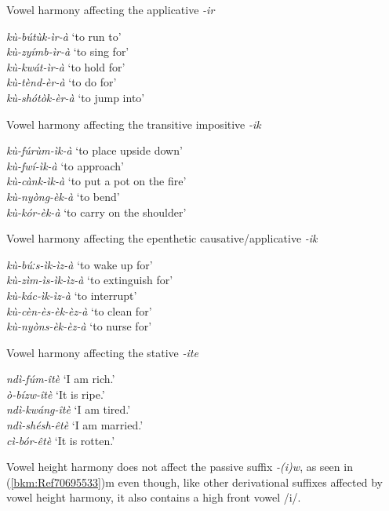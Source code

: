 \ea
\label{bkm:Ref98928900}
  Vowel harmony affecting the applicative \textit{-ir}

{\itshape kù-bútùk-ìr-à} \tab  ‘to run to’\\
{\itshape kù-zyímb-ìr-à} \tab  ‘to sing for’\\
{\itshape kù-kwát-ìr-à} \tab  ‘to hold for’\\
{\itshape kù-tènd-èr-à} \tab  ‘to do for’\\
{\itshape kù-shótòk-èr-à} \tab  ‘to jump into’\\
\z

\ea
\label{bkm:Ref98928913}
  Vowel harmony affecting the transitive impositive \textit{-ik}

{\itshape kù-fúrùm-ìk-à} \tab  ‘to place upside down’\\
{\itshape kù-fwí-ìk-à} \tab  ‘to approach’\\
{\itshape kù-cànk-ìk-à} \tab  ‘to put a pot on the fire’\\
{\itshape kù-nyòng-èk-à} \tab  ‘to bend’\\
{\itshape kù-kór-èk-à} \tab  ‘to carry on the shoulder’\\
\z

\ea
\label{bkm:Ref98928937}
  Vowel harmony affecting the epenthetic causative/applicative \textit{-ik}

{\itshape kù-búːs-ìk-ìz-à} \tab  ‘to wake up for’\\
{\itshape kù-zìm-ìs-ìk-ìz-à} \tab  ‘to extinguish for’\\
{\itshape kù-kác-ìk-ìz-à} \tab  ‘to interrupt’\\
{\itshape kù-cèn-ès-èk-èz-à} \tab  ‘to clean for’\\
{\itshape kù-nyòns-èk-èz-à} \tab  ‘to nurse for’\\
\z

\ea
\label{bkm:Ref98928980}
  Vowel harmony affecting the stative \textit{-ite}

{\itshape ndì-fúm-îtè} \tab  ‘I am rich.’\\
{\itshape ò-bízw-îtè} \tab  ‘It is ripe.’\\
{\itshape ndì-kwáng-îtè} \tab  ‘I am tired.’\\
{\itshape ndì-shésh-êtè} \tab  ‘I am married.’\\
{\itshape cì-bór-êtè} \tab  ‘It is rotten.’\\
\z

Vowel height harmony does not affect the passive suffix \textit{-(i)w}, as seen in (\ref{bkm:Ref70695533})m even though, like other derivational suffixes affected by vowel height harmony, it also contains a high front vowel /i/.

